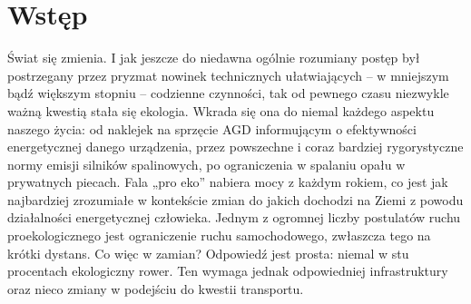 \chapter{Wstęp}
\label{cha:wstep}

Świat się zmienia. I jak jeszcze do niedawna ogólnie rozumiany postęp był postrzegany przez pryzmat nowinek technicznych ułatwiających – w mniejszym bądź większym stopniu – codzienne czynności, tak od pewnego czasu niezwykle ważną kwestią stała się ekologia. Wkrada się ona do niemal każdego aspektu naszego życia: od naklejek na sprzęcie AGD informującym o efektywności energetycznej danego urządzenia, przez powszechne i coraz bardziej rygorystyczne normy emisji silników spalinowych, po ograniczenia w spalaniu opału w prywatnych piecach. Fala „pro eko” nabiera mocy z każdym rokiem, co jest jak najbardziej zrozumiałe w kontekście zmian do jakich dochodzi na Ziemi z powodu działalności energetycznej człowieka. Jednym z ogromnej liczby postulatów ruchu proekologicznego jest ograniczenie ruchu samochodowego, zwłaszcza tego na krótki dystans. Co więc w zamian? Odpowiedź jest prosta: niemal w stu procentach ekologiczny rower. Ten wymaga jednak odpowiedniej infrastruktury oraz nieco zmiany w podejściu do kwestii transportu. \newline
